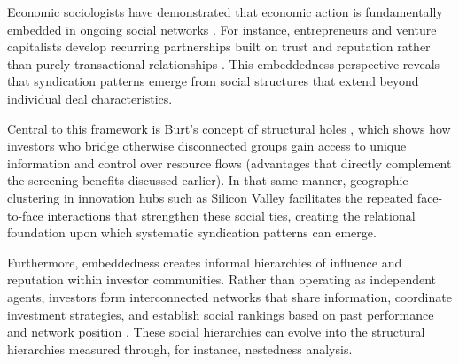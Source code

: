 Economic sociologists have demonstrated that economic action is fundamentally embedded in ongoing social networks \cite{Granovetter1985}. For instance, entrepreneurs and venture capitalists develop recurring partnerships built on trust and reputation rather than purely transactional relationships \cite{Uzzi1997}. This embeddedness perspective reveals that syndication patterns emerge from social structures that extend beyond individual deal characteristics.

Central to this framework is Burt's concept of structural holes \cite{Burt1992}, which shows how investors who bridge otherwise disconnected groups gain access to unique information and control over resource flows (advantages that directly complement the screening benefits discussed earlier). In that same manner, geographic clustering in innovation hubs such as Silicon Valley facilitates the repeated face-to-face interactions that strengthen these social ties, creating the relational foundation upon which systematic syndication patterns can emerge.



Furthermore, embeddedness creates informal hierarchies of influence and reputation within investor communities. Rather than operating as independent agents, investors form interconnected networks that share information, coordinate investment strategies, and establish social rankings based on past performance and network position \cite{Granovetter1985}. These social hierarchies can evolve into the structural hierarchies measured through, for instance, nestedness analysis.


